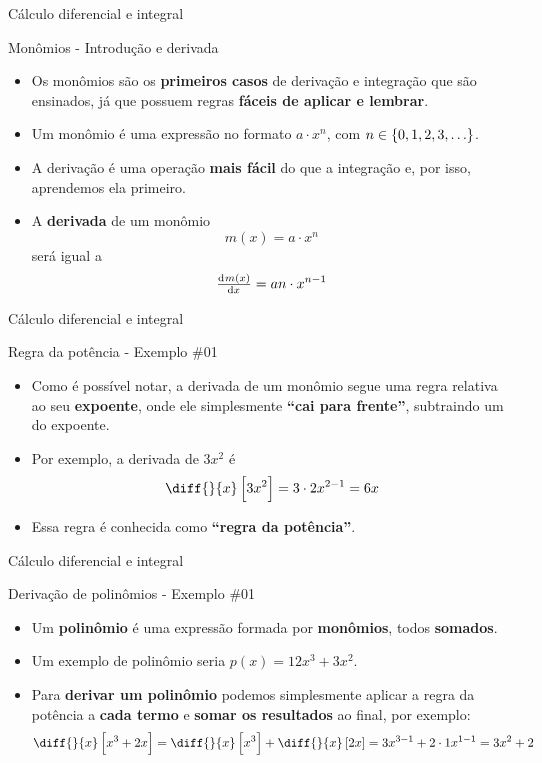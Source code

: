 \begin{frame}{Cálculo diferencial e integral}
	\begin{block}{Monômios - Introdução e derivada}
		\begin{itemize}
			\item Os monômios são os \textbf{primeiros casos} de derivação e integração que são ensinados, já que possuem regras \textbf{fáceis de aplicar e lembrar}.
			\item Um monômio é uma expressão no formato $ a\cdot x^{n} $, com $ n\in\set{0,1,2,3,\ldots} $.
			\item A derivação é uma operação \textbf{mais fácil} do que a integração e, por isso, aprendemos ela primeiro.
			\item A \textbf{derivada} de um monômio \[  m(x)=a\cdot x^{n} \] será igual a \[ \od{m(x)}{x}= a n\cdot x^{n-1} \]
		\end{itemize}
	\end{block}
\end{frame}


\begin{frame}{Cálculo diferencial e integral}
	\begin{block}{Regra da potência - Exemplo \#01}
		\begin{itemize}
			\item Como é possível notar, a derivada de um monômio segue uma regra relativa ao seu \textbf{expoente}, onde ele simplesmente \textbf{``cai para frente''}, subtraindo um do expoente.
			\item Por exemplo, a derivada de $ 3x^{2} $ é \[ \diff{}{x}\sbr{3x^{2}} =3\cdot2x^{2-1}=6x  \]
			\item Essa regra é conhecida como \textbf{``regra da potência''}.
		\end{itemize}
	\end{block}
\end{frame}


\begin{frame}{Cálculo diferencial e integral}
	\begin{block}{Derivação de polinômios - Exemplo \#01}
		\begin{itemize}
			\item Um \textbf{polinômio} é uma expressão formada por \textbf{monômios}, todos \textbf{somados}.
			\item Um exemplo de polinômio seria $ p(x)=12x^{3}+3x^{2} $.
			\item Para \textbf{derivar um polinômio} podemos simplesmente aplicar a regra da potência a \textbf{cada termo} e \textbf{somar os resultados} ao final, por exemplo:
			\[ \diff{}{x}\sbr{x^{3}+2x}=\diff{}{x}\sbr{x^{3}}+\diff{}{x}\sbr{2x}=3x^{3-1}+2\cdot 1x^{1-1}=3x^{2}+2 \]
		\end{itemize}
	\end{block}
\end{frame}


